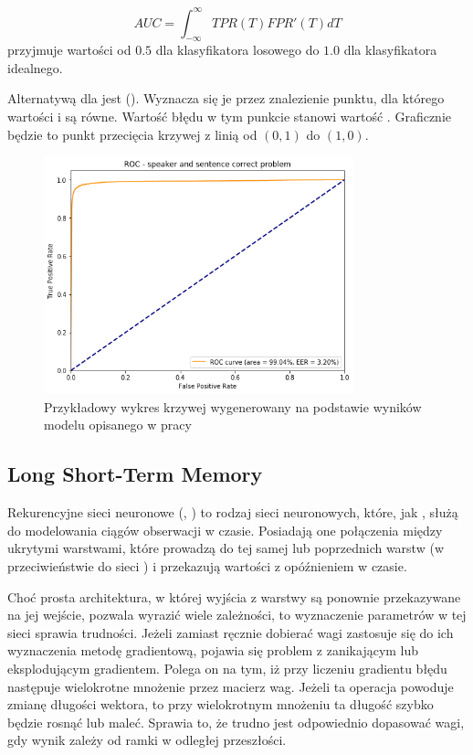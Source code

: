 $$\mathit{AUC} = \int_{-\infty}^{\infty} \mathit{TPR}(T) \mathit{FPR}'(T) dT$$
 przyjmuje wartości od $0.5$ dla klasyfikatora losowego do $1.0$ dla klasyfikatora idealnego.

Alternatywą dla  jest  (). Wyznacza się je
przez znalezienie punktu, dla którego wartości  i  są równe. Wartość błędu
w tym punkcie stanowi wartość . Graficznie będzie to punkt przecięcia krzywej 
z linią od $(0, 1)$ do $(1, 0)$.

\begin{figure}[H]
    \centering
    \includegraphics[width=0.8\textwidth]{images/2_2_b_roc_example}
    \caption{Przykładowy wykres krzywej  wygenerowany na podstawie wyników modelu  opisanego w pracy}
    \label{fig:2_2_b_roc_example}
\end{figure}

\subsection{Long Short-Term Memory}

Rekurencyjne sieci neuronowe (, ) to rodzaj sieci neuronowych,
które, jak , służą do modelowania ciągów obserwacji w czasie. Posiadają one połączenia między
ukrytymi warstwami, które prowadzą do tej samej lub poprzednich warstw
(w przeciwieństwie do sieci ) i przekazują wartości z opóźnieniem
w czasie\cite{onTheDifficulty}.

Choć prosta architektura, w której wyjścia z warstwy są ponownie przekazywane na jej wejście, pozwala
wyrazić wiele zależności, to wyznaczenie parametrów w tej sieci sprawia trudności. Jeżeli zamiast
ręcznie dobierać wagi zastosuje się do ich wyznaczenia metodę gradientową, pojawia się problem
z zanikającym lub eksplodującym gradientem. Polega on na tym, iż przy liczeniu gradientu błędu
następuje wielokrotne mnożenie przez macierz wag. Jeżeli ta operacja powoduje zmianę długości
wektora, to przy wielokrotnym mnożeniu ta długość szybko będzie rosnąć lub maleć. Sprawia to,
że trudno jest odpowiednio dopasować wagi, gdy wynik zależy od ramki w odległej przeszłości.

